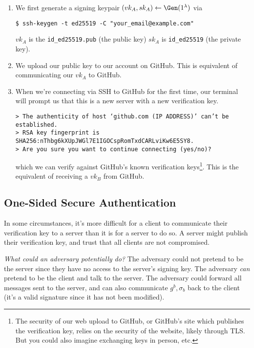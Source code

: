 \begin{enumerate}
    \item We first generate a signing keypair $(vk_A, sk_A) \leftarrow \Gen(1^\lambda)$ via

          \texttt{\$ ssh-keygen -t ed25519 -C "your\_email@example.com"}

          $vk_A$ is the \texttt{id\_ed25519.pub} (the public key) $sk_A$ is \texttt{id\_ed25519} (the private key).
    \item We upload our public key to our account on GitHub. This is equivalent of communicating our $vk_A$ to GitHub.
    \item When we're connecting via SSH to GitHub for the first time, our terminal will prompt us that this is a new server with a new verification key.

          \texttt{> The authenticity of host `github.com (IP ADDRESS)' can't be established. \\
              > RSA key fingerprint is SHA256:nThbg6kXUpJWGl7E1IGOCspRomTxdCARLviKw6E5SY8. \\
              > Are you sure you want to continue connecting (yes/no)?}

          which we can verify against GitHub's known verification keys\footnote{The security of our web upload to GitHub, or GitHub's site which publishes the verification key, relies on the security of the website, likely through TLS. But you could also imagine exchanging keys in person, etc. }. This is the equivalent of receiving a $vk_B$ from GitHub.
\end{enumerate}

\subsection{One-Sided Secure Authentication}
In some circumstances, it's more difficult for a client to communicate their verification key to a server than it is for a server to do so. A server might publish their verification key, and trust that all clients are not compromised.


\emph{What could an adversary potentially do?} The adversary could not pretend to be the server since they have no access to the server's signing key. The adversary \emph{can} pretend to be the client and talk to the server. The adversary could forward all messages sent to the server, and can also communicate $g^b, \sigma_b$ back to the client (it's a valid signature since it has not been modified).

